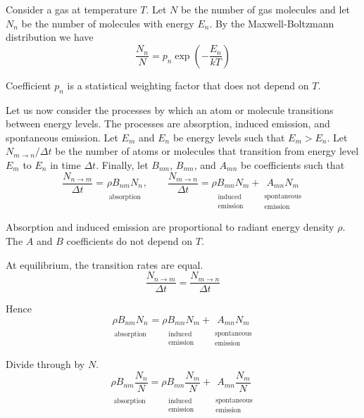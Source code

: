 \documentclass[12pt]{article}
\newcommand\BNM{B_{nm}} %
\newcommand\BMN{B_{mn}} %
\newcommand\AMN{A_{mn}} %
\newcommand\RHO{\rho}
\newcommand\ABSORPTION{\substack{\\[1ex] \text{absorption}}}
\newcommand\INDUCED{\substack{\\[1ex] \text{induced}\\ \text{emission}}}
\newcommand\SPONTANEOUS{\substack{\\[1ex] \text{spontaneous}\\ \text{emission}}}
\begin{document}

Consider a gas at temperature $T$.
Let $N$ be the number of gas molecules
and let $N_n$ be the number of molecules with energy $E_n$.
By the Maxwell-Boltzmann distribution we have
\begin{equation*}
\frac{N_n}{N}=p_n\exp\left(-\frac{E_n}{kT}\right)
\tag{1}
\end{equation*}

\noindent
Coefficient $p_n$ is a statistical weighting factor that does not depend on $T$.

\bigskip
\noindent
Let us now consider the processes by which an atom or molecule transitions between energy levels.
The processes are absorption, induced emission, and spontaneous emission.
Let $E_m$ and $E_n$ be energy levels such that $E_m>E_n$.
Let $N_{m\rightarrow n}/\Delta t$ be the number of atoms or molecules that transition from energy level $E_m$ to $E_n$ in time $\Delta t$.
Finally, let $\BNM$, $\BMN$, and $\AMN$ be coefficients such that
\begin{equation*}
\frac{N_{n\rightarrow m}}{\Delta t}
=\underset{\ABSORPTION}{\RHO\BNM N_n},
\qquad
\frac{N_{m\rightarrow n}}{\Delta t}
=\underset{\INDUCED}{\RHO\BMN N_m}
+
\underset{\SPONTANEOUS}{\AMN N_m}
\end{equation*}

\noindent
Absorption and induced emission are proportional to radiant energy density $\rho$.
The $A$ and $B$ coefficients do not depend on $T$.

\bigskip
\noindent
At equilibrium, the transition rates are equal.
\begin{equation*}
\frac{N_{n\rightarrow m}}{\Delta t}=\frac{N_{m\rightarrow n}}{\Delta t}
\end{equation*}

\noindent
Hence
\begin{equation*}
\underset{\ABSORPTION}{\RHO\BNM N_n}
=\underset{\INDUCED}{\RHO\BMN N_m}
+\underset{\SPONTANEOUS}{\AMN N_m}
\end{equation*}

\noindent
Divide through by $N$.
\begin{equation*}
\underset{\ABSORPTION}{\RHO\BNM \frac{N_n}{N}}
=\underset{\INDUCED}{\RHO\BMN \frac{N_m}{N}}
+\underset{\SPONTANEOUS}{\AMN \frac{N_m}{N}}
\end{equation*}
\end{document}
